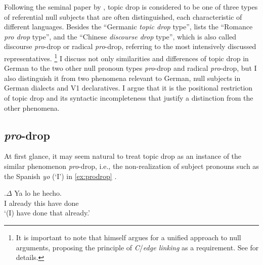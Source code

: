 Following the seminal paper by \citet{huang1984}, topic drop is considered to be one of three types of referential null subjects  that are often distinguished, each characteristic of different languages.
Besides the ``Germanic \textit{topic drop} type'', \citet[268]{sigurdsson2011} lists the ``Romance \textit{pro drop} type'',  and the ``Chinese  \textit{discourse drop}  type'', which is also called discourse \textit{pro}-drop or radical \textit{pro}-drop, referring to the most intensively discussed representatives.%
\footnote{It is important to note that \citet{sigurdsson2011} himself argues for a unified approach to null arguments,  proposing the principle of \textit{C}/\textit{edge linking} as a requirement.
See  for details.}
%
I discuss not only similarities and differences of topic drop in German to the two other null pronoun types \textit{pro}-drop and radical \textit{pro}-drop, but I also distinguish it from two phenomena relevant to German, null subjects  in German dialects and V1 declaratives.
I argue that it is the positional restriction of topic drop and its syntactic incompleteness that justify a distinction from the other phenomena.

\subsection{\textit{pro}-drop}\label{sec:prodrop} 
At first glance, it may seem natural to treat topic drop as an instance of the similar phenomenon \textit{pro}-drop, i.e., the non-realization of subject pronouns such as the Spanish  \textit{yo} (`I') in \ref{ex:prodrop} \citep{perlmutter1971}.

\exg.\label{ex:prodrop}$\Delta$ Ya lo he hecho.\\
I already this have done\\
`(I) have done that already.'

